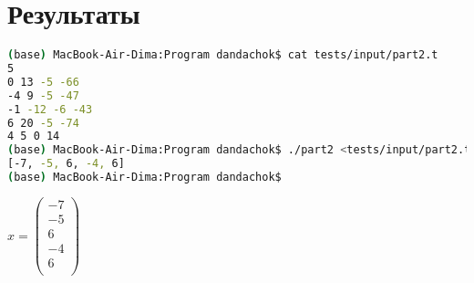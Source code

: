 \section*{Результаты}

\begin{lstlisting}[language=bash]
(base) MacBook-Air-Dima:Program dandachok$ cat tests/input/part2.t
5
0 13 -5 -66
-4 9 -5 -47
-1 -12 -6 -43
6 20 -5 -74
4 5 0 14
(base) MacBook-Air-Dima:Program dandachok$ ./part2 <tests/input/part2.t
[-7, -5, 6, -4, 6]
(base) MacBook-Air-Dima:Program dandachok$ 
\end{lstlisting}

$x = \begin{pmatrix}
    -7 \\
    -5 \\
    6 \\
    -4 \\
    6 \\
\end{pmatrix}$

\pagebreak